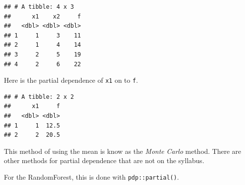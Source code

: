 \documentclass[openany]{book}
\newenvironment{Shaded}{\begin{snugshade}}{\end{snugshade}}
\newcommand{\DataTypeTok}[1]{\textcolor[rgb]{0.13,0.29,0.53}{#1}}
\newcommand{\DecValTok}[1]{\textcolor[rgb]{0.00,0.00,0.81}{#1}}
\newcommand{\KeywordTok}[1]{\textcolor[rgb]{0.13,0.29,0.53}{\textbf{#1}}}
\newcommand{\NormalTok}[1]{#1}
\newcommand{\OperatorTok}[1]{\textcolor[rgb]{0.81,0.36,0.00}{\textbf{#1}}}
\newcommand{\StringTok}[1]{\textcolor[rgb]{0.31,0.60,0.02}{#1}}
\begin{document}
\begin{verbatim}
## # A tibble: 4 x 3
##      x1    x2     f
##   <dbl> <dbl> <dbl>
## 1     1     3    11
## 2     1     4    14
## 3     2     5    19
## 4     2     6    22
\end{verbatim}

Here is the partial dependence of \texttt{x1} on to \texttt{f}.

\begin{Shaded}
\end{Shaded}

\begin{verbatim}
## # A tibble: 2 x 2
##      x1     f
##   <dbl> <dbl>
## 1     1  12.5
## 2     2  20.5
\end{verbatim}

This method of using the mean is know as the \emph{Monte Carlo} method. There are other methods for partial dependence that are not on the syllabus.

For the RandomForest, this is done with \texttt{pdp::partial()}.

\begin{Shaded}
\end{Shaded}
\end{document}
